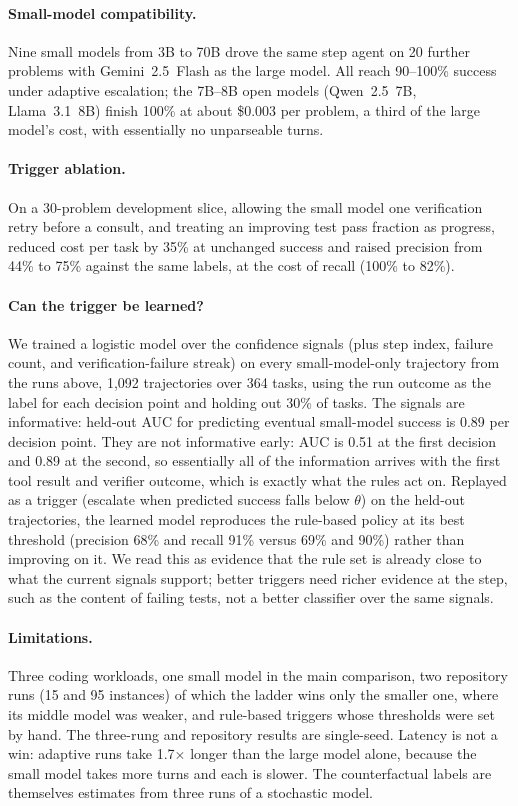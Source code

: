 \paragraph{Small-model compatibility.}
Nine small models from 3B to 70B drove the same step agent on 20 further problems with Gemini~2.5~Flash as the large model.
All reach 90--100\% success under adaptive escalation; the 7B--8B open models (Qwen~2.5~7B, Llama~3.1~8B) finish 100\% at about \$0.003 per problem, a third of the large model's cost, with essentially no unparseable turns.

\paragraph{Trigger ablation.}
On a 30-problem development slice, allowing the small model one verification retry before a consult, and treating an improving test pass fraction as progress, reduced cost per task by 35\% at unchanged success and raised precision from 44\% to 75\% against the same labels, at the cost of recall (100\% to 82\%).

\paragraph{Can the trigger be learned?}
We trained a logistic model over the confidence signals (plus step index, failure count, and verification-failure streak) on every small-model-only trajectory from the runs above, 1{,}092 trajectories over 364 tasks, using the run outcome as the label for each decision point and holding out 30\% of tasks.
The signals are informative: held-out AUC for predicting eventual small-model success is 0.89 per decision point.
They are not informative early: AUC is 0.51 at the first decision and 0.89 at the second, so essentially all of the information arrives with the first tool result and verifier outcome, which is exactly what the rules act on.
Replayed as a trigger (escalate when predicted success falls below $\theta$) on the held-out trajectories, the learned model reproduces the rule-based policy at its best threshold (precision 68\% and recall 91\% versus 69\% and 90\%) rather than improving on it.
We read this as evidence that the rule set is already close to what the current signals support; better triggers need richer evidence at the step, such as the content of failing tests, not a better classifier over the same signals.

\paragraph{Limitations.}
Three coding workloads, one small model in the main comparison, two repository runs (15 and 95 instances) of which the ladder wins only the smaller one, where its middle model was weaker, and rule-based triggers whose thresholds were set by hand.
The three-rung and repository results are single-seed.
Latency is not a win: adaptive runs take 1.7$\times$ longer than the large model alone, because the small model takes more turns and each is slower.
The counterfactual labels are themselves estimates from three runs of a stochastic model.
